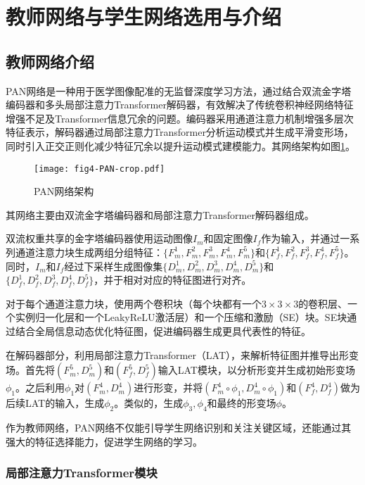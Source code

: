 \section{教师网络与学生网络选用与介绍}

\subsection{教师网络介绍}

PAN网络是一种用于医学图像配准的无监督深度学习方法，通过结合双流金字塔编码器和多头局部注意力Transformer解码器，有效解决了传统卷积神经网络特征增强不足及Transformer信息冗余的问题。编码器采用通道注意力机制增强多层次特征表示，解码器通过局部注意力Transformer分析运动模式并生成平滑变形场，同时引入正交正则化减少特征冗余以提升运动模式建模能力。其网络架构如图\ref{fig:4}。

\begin{figure}[h]
    \centering
    \texttt{[image: fig4-PAN-crop.pdf]}
    \caption{PAN网络架构}
    \label{fig:4}
\end{figure}

其网络主要由双流金字塔编码器和局部注意力Transformer解码器组成。

双流权重共享的金字塔编码器使用运动图像$I_m$和固定图像$I_f$作为输入，并通过一系列通道注意力块生成两组分组特征：$\{F_m^1,F_m^2,F_m^3,F_m^4,F_m^5\}$和$\{F_f^1,F_f^2,F_f^3,F_f^4,F_f^5\}$。同时，$I_m$和$I_f$经过下采样生成图像集$\{D_m^1,D_m^2,D_m^3,D_m^4,D_m^5\}$和$\{D_f^1,D_f^2,D_f^3,D_f^4,D_f^5\}$，并于相对对应的特征图进行对齐。

对于每个通道注意力块，使用两个卷积块（每个块都有一个$3\times3\times 3$的卷积层、一个实例归一化层\cite{ulyanov2016instance}和一个LeakyReLU激活层）和一个压缩和激励（SE）块\cite{hu2018squeeze}。SE块通过结合全局信息动态优化特征图，促进编码器生成更具代表性的特征。

在解码器部分，利用局部注意力Transformer（LAT），来解析特征图并推导出形变场。首先将$(F_m^5,D_m^5)$和$(F_f^5,D_f^5)$输入LAT模块，以分析形变并生成初始形变场$\phi_1$。之后利用$\phi_1$对$(F_m^4,D_m^4)$进行形变，并将$(F_m^4\circ \phi_1,D_m^4\circ\phi_1 )$和$(F_f^4,D_f^4)$做为后续LAT的输入，生成$\phi_2$。类似的，生成$\phi_3,\phi_4$和最终的形变场$\phi$。

作为教师网络，PAN网络不仅能引导学生网络识别和关注关键区域，还能通过其强大的特征选择能力，促进学生网络的学习。

\subsubsection{局部注意力Transformer模块}

